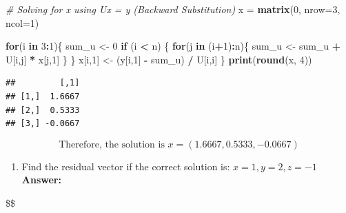 \documentclass[
]{article}
\newenvironment{Shaded}{\begin{snugshade}}{\end{snugshade}}
\newcommand{\AttributeTok}[1]{\textcolor[rgb]{0.13,0.29,0.53}{#1}}
\newcommand{\CommentTok}[1]{\textcolor[rgb]{0.56,0.35,0.01}{\textit{#1}}}
\newcommand{\ControlFlowTok}[1]{\textcolor[rgb]{0.13,0.29,0.53}{\textbf{#1}}}
\newcommand{\DecValTok}[1]{\textcolor[rgb]{0.00,0.00,0.81}{#1}}
\newcommand{\FunctionTok}[1]{\textcolor[rgb]{0.13,0.29,0.53}{\textbf{#1}}}
\newcommand{\NormalTok}[1]{#1}
\newcommand{\OtherTok}[1]{\textcolor[rgb]{0.56,0.35,0.01}{#1}}
\newcommand{\SpecialCharTok}[1]{\textcolor[rgb]{0.81,0.36,0.00}{\textbf{#1}}}
\providecommand{\tightlist}{%
  \setlength{\itemsep}{0pt}\setlength{\parskip}{0pt}}
\begin{document}
\begin{Shaded}
\begin{Highlighting}[]
\CommentTok{\# Solving for x using Ux = y (Backward Substitution)}
\NormalTok{x }\OtherTok{=} \FunctionTok{matrix}\NormalTok{(}\DecValTok{0}\NormalTok{, }\AttributeTok{nrow=}\DecValTok{3}\NormalTok{, }\AttributeTok{ncol=}\DecValTok{1}\NormalTok{)}

\ControlFlowTok{for}\NormalTok{(i }\ControlFlowTok{in} \DecValTok{3}\SpecialCharTok{:}\DecValTok{1}\NormalTok{)\{}
\NormalTok{  sum\_u }\OtherTok{\textless{}{-}} \DecValTok{0}
  \ControlFlowTok{if}\NormalTok{ (i }\SpecialCharTok{\textless{}}\NormalTok{ n) \{}
    \ControlFlowTok{for}\NormalTok{(j }\ControlFlowTok{in}\NormalTok{ (i}\SpecialCharTok{+}\DecValTok{1}\NormalTok{)}\SpecialCharTok{:}\NormalTok{n)\{}
\NormalTok{      sum\_u }\OtherTok{\textless{}{-}}\NormalTok{ sum\_u }\SpecialCharTok{+}\NormalTok{ U[i,j] }\SpecialCharTok{*}\NormalTok{ x[j,}\DecValTok{1}\NormalTok{]}
\NormalTok{    \}}
\NormalTok{  \}}
\NormalTok{  x[i,}\DecValTok{1}\NormalTok{] }\OtherTok{\textless{}{-}}\NormalTok{ (y[i,}\DecValTok{1}\NormalTok{] }\SpecialCharTok{{-}}\NormalTok{ sum\_u) }\SpecialCharTok{/}\NormalTok{ U[i,i]}
\NormalTok{\}}
\FunctionTok{print}\NormalTok{(}\FunctionTok{round}\NormalTok{(x, }\DecValTok{4}\NormalTok{))}
\end{Highlighting}
\end{Shaded}

\begin{verbatim}
##         [,1]
## [1,]  1.6667
## [2,]  0.5333
## [3,] -0.0667
\end{verbatim}

\[
\boxed{
\text{Therefore, the solution is } x = (1.6667, 0.5333, -0.0667)
}
\]

\begin{enumerate}
\def\labelenumi{\alph{enumi}.}
\setcounter{enumi}{2}
\tightlist
\item
  Find the residual vector if the correct solution is:
  \(x=1, y=2, z=-1\) \textbf{Answer:}
\end{enumerate}

\$\$
\end{document}
